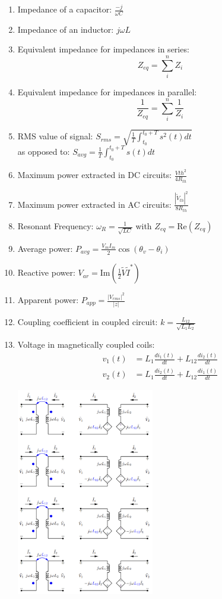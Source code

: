\documentclass[twocolumn]{article}
\begin{document}
\begin{enumerate}
    \item Impedance of a capacitor: $\frac{-j}{\omega C}$
    \item Impedance of an inductor: $j \omega L$
    \item Equivalent impedance for impedances in series: 
    \[Z_{eq} = \sum_{i}^{n} Z_i\]
    \item Equivalent impedance for impedances in parallel: 
    \[\frac{1}{Z_{eq}} = \sum_{i}^{n} \frac{1}{Z_i}\]
    \item RMS value of signal: $S_{rms} = \sqrt{\frac{1}{T}\int_{t_0}^{t_0+T} s^2(t) dt}$\\as opposed to: \hspace{1cm}$S_{avg}=\frac{1}{T}\int_{t_0}^{t_0+T} s(t) dt$
    \item Maximum power extracted in DC circuits: $\frac{V{th}^2}{4R_{th}}$
    \item Maximum power extracted in AC circuits: $\frac{|\tilde{V}_{th}|^2}{8R_{th}}$
    \item Resonant Frequency: $\omega_R = \frac{1}{\sqrt{LC}}$ with $Z_{eq}=\text{Re}(Z_{eq})$
    \item Average power: $P_{avg} = \frac{V_m I_m}{2}\cos{(\theta_v - \theta_i)}$
    \item Reactive power: $V_{ar} = \text{Im}(\frac{1}{2}\tilde{V}\tilde{I}^*)$
    \item Apparent power: $P_{app} = \frac{|V_{rms}|^2}{|z|}$
    \item Coupling coefficient in coupled circuit: $k = \frac{L_{12}}{\sqrt{L_1 L_2}}$
    \item Voltage in magnetically coupled coils: 
    \begin{align*}
        v_{1}(t) &= L_1 \frac{di_1(t)}{dt} + L_{12}\frac{di_2(t)}{dt} \\
        v_{2}(t) &= L_1 \frac{di_2(t)}{dt} + L_{12}\frac{di_1(t)}{dt} 
    \end{align*}
    \begin{center}
    \includegraphics[width=6cm]{images/transformer_transform.png}

\end{center}
\end{enumerate}
\end{document}
